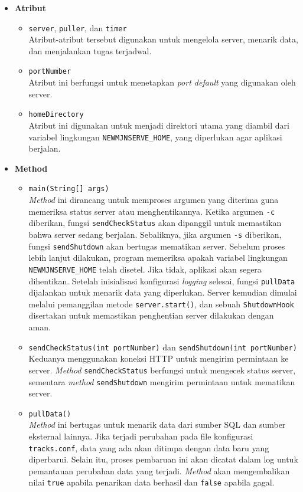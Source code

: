 \begin{itemize}
    \item \textbf{Atribut}
    \begin{itemize}
        \item \texttt{server}, \texttt{puller}, dan \texttt{timer}
        \\ Atribut-atribut tersebut digunakan untuk mengelola server, menarik data, dan menjalankan tugas terjadwal.
        \item \texttt{portNumber}
        \\ Atribut ini berfungsi untuk menetapkan \textit{port default} yang digunakan oleh server.
        \item \texttt{homeDirectory}
        \\ Atribut ini digunakan untuk menjadi direktori utama yang diambil dari variabel lingkungan \texttt{NEWMJNSERVE\_HOME}, yang diperlukan agar aplikasi berjalan.
    \end{itemize}
    \newpage
    \item \textbf{Method}
    \begin{itemize}
        \item \texttt{main(String[] args)}
        \\ \textit{Method} ini dirancang untuk memproses argumen yang diterima guna memeriksa status server atau menghentikannya. Ketika argumen \texttt{-c} diberikan, fungsi \texttt{sendCheckStatus} akan dipanggil untuk memastikan bahwa server sedang berjalan. Sebaliknya, jika argumen \texttt{-s} diberikan, fungsi \texttt{sendShutdown} akan bertugas mematikan server. Sebelum proses lebih lanjut dilakukan, program memeriksa apakah variabel lingkungan \texttt{NEWMJNSERVE\_HOME} telah disetel. Jika tidak, aplikasi akan segera dihentikan. Setelah inisialisasi konfigurasi \textit{logging} selesai, fungsi \texttt{pullData} dijalankan untuk menarik data yang diperlukan. Server kemudian dimulai melalui pemanggilan metode \texttt{server.start()}, dan sebuah \texttt{ShutdownHook} disertakan untuk memastikan penghentian server dilakukan dengan aman.
        
        \item \texttt{sendCheckStatus(int portNumber)} dan \texttt{sendShutdown(int portNumber)}
        \\ Keduanya menggunakan koneksi HTTP untuk mengirim permintaan ke server. \textit{Method} \texttt{sendCheckStatus} berfungsi untuk mengecek status server, sementara \textit{method} \texttt{sendShutdown} mengirim permintaan untuk mematikan server.

        \item \texttt{pullData()}
        \\ \textit{Method} ini bertugas untuk menarik data dari sumber SQL dan sumber eksternal lainnya. Jika terjadi perubahan pada file konfigurasi \texttt{tracks.conf}, data yang ada akan ditimpa dengan data baru yang diperbarui. Selain itu, proses pembaruan ini akan dicatat dalam log untuk pemantauan perubahan data yang terjadi. \textit{Method} akan mengembalikan nilai \texttt{true} apabila penarikan data berhasil dan \texttt{false} apabila gagal.


\end{itemize}
\end{itemize}
